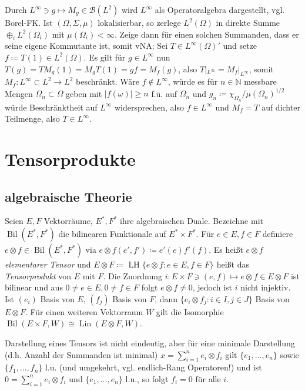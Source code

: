 \documentclass[11pt,a4paper]{scrartcl}
\newcommand{\N}{\mathbb{N}} %
\newcommand{\B}{\mathcal{B}}
\theoremstyle{plain}
\theoremstyle{definition}
\theoremstyle{remark}
\DeclareMathOperator{\Bil}{Bil}
\DeclareMathOperator{\Lin}{Lin}
\DeclareMathOperator{\LH}{LH}
\begin{document}
Durch $L^\infty \ni g \mapsto M_g \in \B(L^2)$ wird $L^\infty$ als Operatoralgebra dargestellt, vgl. Borel-FK. Ist $(\Omega,\Sigma,\mu)$ lokalisierbar, so zerlege $L^2(\Omega)$ in direkte Summe $\oplus_i L^2(\Omega_i)$ mit $\mu(\Omega_i) < \infty$. Zeige dann für einen solchen Summanden, dass er seine eigene Kommutante ist, somit vNA: Sei $T\in L^\infty(\Omega)'$ und setze $f\coloneqq T(1)\in L^2(\Omega)$. Es gilt für $g\in L^\infty$ nun $T(g)=TM_g(1)=M_gT(1)=gf=M_f(g)$, also $T|_{L^\infty}=M_f|_{L^\infty}$, somit $M_f: L^\infty \subset L^2 \to L^2$ beschränkt. Wäre $f\not\in L^\infty$, würde es für $n\in \N$ messbare Mengen $\Omega_n \subset \Omega$ geben mit $|f(\omega)| \geq n$ f.ü. auf $\Omega_n$ und $g_n\coloneqq \chi_{\Omega_n}/\mu(\Omega_n)^{1/2}$ würde Beschränktheit auf $L^\infty$ widersprechen, also $f\in L^\infty$ und $M_f=T$ auf dichter Teilmenge, also $T\in L^\infty$.

\section{Tensorprodukte}

\subsection{algebraische Theorie}

Seien $E,F$ Vektorräume, $E^*,F^*$ ihre algebraischen Duale. Bezeichne mit $\Bil(E^*,F^*)$ die bilinearen Funktionale auf $E^*\times F^*$. Für $e\in E, f\in F$ definiere $e\otimes f\in \Bil(E^*, F^*)$ via $e\otimes f(e',f')\coloneqq e'(e)f'(f)$. Es heißt $e\otimes f$ \emph{elementarer Tensor} und $E\otimes F\coloneqq \LH \{e\otimes f: e\in E, f\in F\}$ heißt das \emph{Tensorprodukt} von $E$ mit $F$. Die Zuordnung $i: E\times F \ni (e,f) \mapsto e\otimes f \in E\otimes F$ ist bilinear und aus $0\neq e\in E, 0\neq f\in F$ folgt $e\otimes f \neq 0$, jedoch ist $i$ nicht injektiv. Ist $(e_i)$ Basis von $E$, $(f_j)$ Basis von $F$, dann $\{e_i\otimes f_j: i\in I, j\in J\}$ Basis von $E\otimes F$. Für einen weiteren Vektorraum $W$ gilt die Isomorphie $\Bil(E\times F, W)\cong \Lin(E\otimes F, W)$.

Darstellung eines Tensors ist nicht eindeutig, aber für eine minimale Darstellung (d.h. Anzahl der Summanden ist minimal) $x=\sum_{i=1}^n e_i\otimes f_i$ gilt $\{e_1,\dots,e_n\}$ sowie $\{f_1,\dots,f_n\}$ l.u. (und umgekehrt, vgl. endlich-Rang Operatoren!) und ist $0=\sum_{i=1}^n e_i\otimes f_i$ und $\{e_1,\dots,e_n\}$ l.u., so folgt $f_i=0$ für alle $i$.
\end{document}
